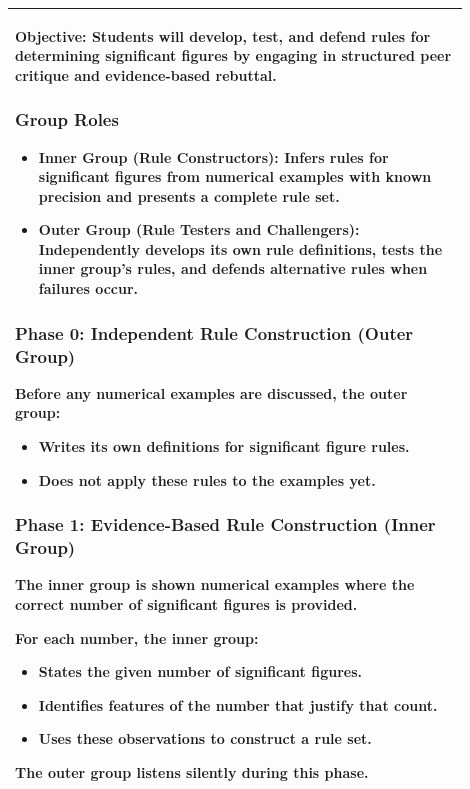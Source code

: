 \documentclass{article}
\begin{document}
\begin{tabular}{|p{0.9\linewidth}|}
\hline
\textbf{Objective:}
Students will develop, test, and defend rules for determining significant figures by engaging in structured peer critique and evidence-based rebuttal.

\subsubsection*{Group Roles}

\begin{itemize}
    \item \textbf{Inner Group (Rule Constructors):} Infers rules for significant figures from numerical examples with known precision and presents a complete rule set.
    \item \textbf{Outer Group (Rule Testers and Challengers):} Independently develops its own rule definitions, tests the inner group’s rules, and defends alternative rules when failures occur.
\end{itemize}

\subsubsection*{Phase 0: Independent Rule Construction (Outer Group)}

Before any numerical examples are discussed, the outer group:
\begin{itemize}
    \item Writes its own definitions for significant figure rules.
    \item Does not apply these rules to the examples yet.
\end{itemize}

\subsubsection*{Phase 1: Evidence-Based Rule Construction (Inner Group)}

The inner group is shown numerical examples where the correct number of significant figures is provided.

For each number, the inner group:
\begin{itemize}
    \item States the given number of significant figures.
    \item Identifies features of the number that justify that count.
    \item Uses these observations to construct a rule set.
\end{itemize}

The outer group listens silently during this phase.\\
\hline
\end{tabular}
\end{document}
